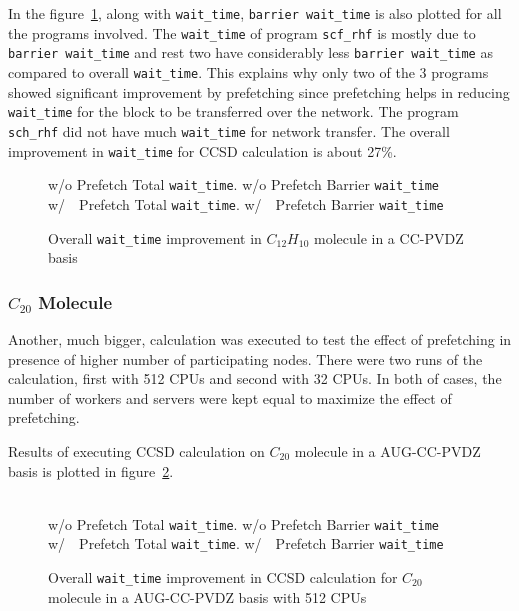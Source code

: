 In the figure~\ref{fig:prefetch_real_barrier}, along with \texttt{wait\_time},
\texttt{barrier wait\_time} is also plotted for all the programs involved. The
\texttt{wait\_time} of program \texttt{scf\_rhf} is mostly due to \texttt{barrier wait\_time}
and rest two have considerably less \texttt{barrier wait\_time} as compared to
overall \texttt{wait\_time}. This explains why only two of the 3 programs showed
significant improvement by prefetching since prefetching helps in reducing \texttt{wait\_time}
for the block to be transferred over the network. The program \texttt{sch\_rhf} did not
have much \texttt{wait\_time} for network transfer. The overall improvement in
\texttt{wait\_time} for CCSD calculation is about 27\%.

\begin{figure}[h]
  
   w/o Prefetch Total \texttt{wait\_time}.
   w/o Prefetch Barrier \texttt{wait\_time}
  \\
   w/~~Prefetch Total \texttt{wait\_time}.
    w/~~Prefetch Barrier \texttt{wait\_time}
  \caption{Overall \texttt{wait\_time} improvement in $C_{12}H_{10}$ molecule in a CC-PVDZ basis}
  \label{fig:prefetch_real_barrier}
\end{figure}

\subsubsection{$C_{20}$ Molecule}
Another, much bigger, calculation was executed to test the effect of prefetching
in presence of higher number of participating nodes. There were two runs of the
calculation, first with 512 CPUs and second with 32 CPUs. In both of cases, the
number of workers and servers were kept equal to maximize the effect of prefetching.

Results of executing CCSD calculation on $C_{20}$ molecule in a AUG-CC-PVDZ basis is
plotted in figure~\ref{fig:prefetch_real_256}.

\begin{figure}[h]
  
  \\
   w/o Prefetch Total \texttt{wait\_time}.
   w/o Prefetch Barrier \texttt{wait\_time}
  \\
   w/~~Prefetch Total \texttt{wait\_time}.
    w/~~Prefetch Barrier \texttt{wait\_time}
  \caption{Overall \texttt{wait\_time} improvement in CCSD calculation for $C_{20}$ molecule in a AUG-CC-PVDZ basis with 512 CPUs}
  \label{fig:prefetch_real_256}
\end{figure}

